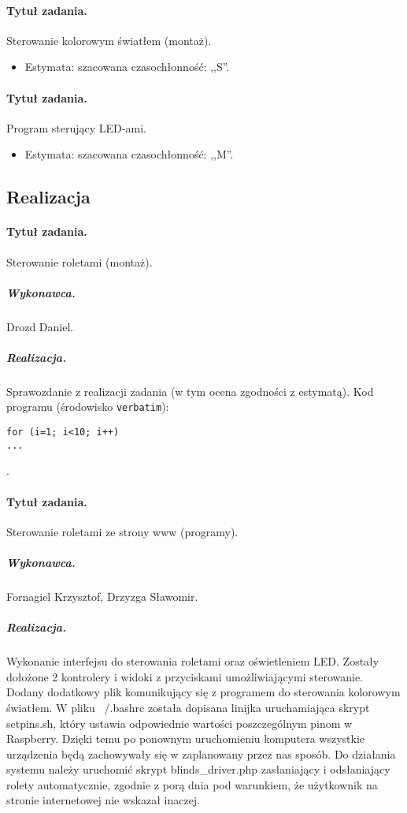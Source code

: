 \paragraph{Tytuł zadania.} Sterowanie kolorowym światłem (montaż).
\begin{itemize}
	\item Estymata: szacowana czasochłonność: ,,S''.
\end{itemize}

\paragraph{Tytuł zadania.} Program sterujący LED-ami.
\begin{itemize}
	\item Estymata: szacowana czasochłonność: ,,M''.
\end{itemize}


\subsection{Realizacja}

\paragraph{Tytuł zadania.} Sterowanie roletami (montaż).
\subparagraph{Wykonawca.} Drozd Daniel.
\subparagraph{Realizacja.} Sprawozdanie z realizacji zadania (w tym ocena zgodności z estymatą). Kod programu (środowisko \texttt{verbatim}): \begin{verbatim}
for (i=1; i<10; i++)
...
\end{verbatim}.

\paragraph{Tytuł zadania.} Sterowanie roletami ze strony www (programy).
\subparagraph{Wykonawca.} Fornagiel Krzysztof, Drzyzga Sławomir.
\subparagraph{Realizacja.} Wykonanie interfejsu do sterowania roletami oraz oświetleniem LED. Zostały dołożone 2 kontrolery i widoki z przyciskami umożliwiającymi sterowanie. Dodany dodatkowy plik komunikujący się z programem do sterowania kolorowym światłem. W pliku ~/.bashrc została dopisana linijka uruchamiająca skrypt setpins.sh, który ustawia odpowiednie wartości poszczególnym pinom w Raspberry. Dzięki temu po ponownym uruchomieniu komputera wszystkie urządzenia będą zachowywały się w zaplanowany przez nas sposób. Do działania systemu należy uruchomić skrypt blinds_driver.php zasłaniający i odsłaniający rolety automatycznie, zgodnie z porą dnia pod warunkiem, że użytkownik na stronie internetowej nie wskazał inaczej.

